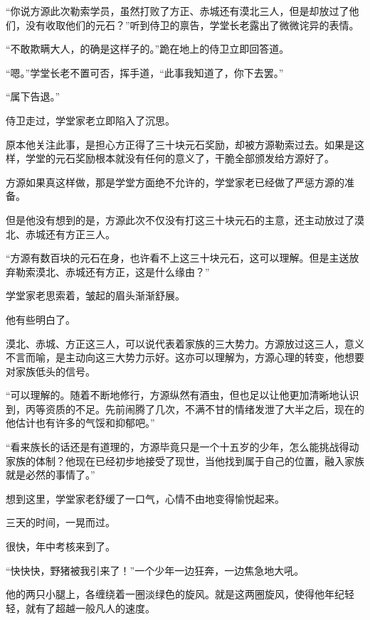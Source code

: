 
\begin{this_body}



“你说方源此次勒索学员，虽然打败了方正、赤城还有漠北三人，但是却放过了他们，没有收取他们的元石？”听到侍卫的禀告，学堂长老露出了微微诧异的表情。

“不敢欺瞒大人，的确是这样子的。”跪在地上的侍卫立即回答道。

“嗯。”学堂长老不置可否，挥手道，“此事我知道了，你下去罢。”

“属下告退。”

侍卫走过，学堂家老立即陷入了沉思。

原本他关注此事，是担心方正得了三十块元石奖励，却被方源勒索过去。如果是这样，学堂的元石奖励根本就没有任何的意义了，干脆全部颁发给方源好了。

方源如果真这样做，那是学堂方面绝不允许的，学堂家老已经做了严惩方源的准备。

但是他没有想到的是，方源此次不仅没有打这三十块元石的主意，还主动放过了漠北、赤城还有方正三人。

“方源有数百块的元石在身，也许看不上这三十块元石，这可以理解。但是主送放弃勒索漠北、赤城还有方正，这是什么缘由？”

学堂家老思索着，皱起的眉头渐渐舒展。

他有些明白了。

漠北、赤城、方正这三人，可以说代表着家族的三大势力。方源放过这三人，意义不言而喻，是主动向这三大势力示好。这亦可以理解为，方源心理的转变，他想要对家族低头的信号。

“可以理解的。随着不断地修行，方源纵然有酒虫，但也足以让他更加清晰地认识到，丙等资质的不足。先前闹腾了几次，不满不甘的情绪发泄了大半之后，现在的他估计也有许多的气馁和抑郁吧。”

“看来族长的话还是有道理的，方源毕竟只是一个十五岁的少年，怎么能挑战得动家族的体制？他现在已经初步地接受了现世，当他找到属于自己的位置，融入家族就是必然的事情了。”

想到这里，学堂家老舒缓了一口气，心情不由地变得愉悦起来。

三天的时间，一晃而过。

很快，年中考核来到了。

“快快快，野猪被我引来了！”一个少年一边狂奔，一边焦急地大吼。

他的两只小腿上，各缠绕着一圈淡绿色的旋风。就是这两圈旋风，使得他年纪轻轻，就有了超越一般凡人的速度。


\end{this_body}
